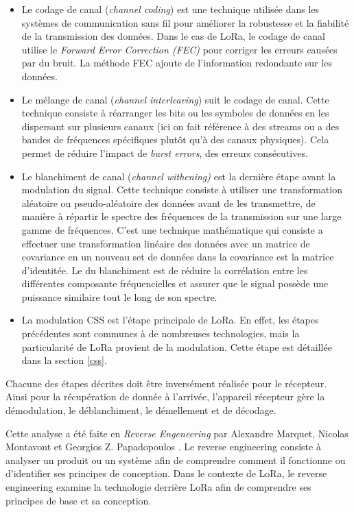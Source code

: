 \begin{itemize}
\item Le codage de canal (\textit{channel coding}) est une technique utilisée dans les systèmes de communication sans fil pour améliorer la robustesse et la fiabilité de la transmission des données. Dans le cas de LoRa, le codage de canal utilise le \textit{Forward Error Correction (FEC)} pour corriger les erreurs causées par du bruit. La méthode FEC ajoute de l'information redondante sur les données.
\item Le mélange de canal (\textit{channel interleaving}) suit le codage de canal.  
Cette technique consiste à réarranger les bits ou les symboles de données en les dispersant sur plusieurs canaux (ici on fait référence à des streams ou a des bandes de fréquences spécifiques plutôt qu'à des canaux physiques). Cela permet de réduire l'impact de \textit{burst errors}, des erreurs consécutives.
\item Le blanchiment de canal (\textit{channel withening)} est la dernière étape avant la modulation du signal.
Cette technique consiste à utiliser une transformation aléatoire ou pseudo-aléatoire des données avant de les transmettre, de manière à répartir le spectre des fréquences de la transmission sur une large gamme de fréquences. C'est une technique mathématique qui consiste a effectuer une transformation linéaire des données avec un matrice de covariance en un nouveau set de données dans la covariance est la matrice d'identitée. Le du blanchiment est de réduire la corrélation entre les différentes composante fréquencielles et assurer que le signal possède une puissance similaire tout le long de son spectre.
\item La modulation CSS est l'étape principale de LoRa. En effet, les étapes précédentes sont communes à de nombreuses technologies, mais la particularité de LoRa provient de la modulation. Cette étape est détaillée dans la section \ref{css}.
\end{itemize}

\vspace{0.1cm}

Chacune des étapes décrites doit être inversément réalisée pour le récepteur. Ainsi pour la récupération de donnée à l'arrivée, l'appareil récepteur gère la démodulation, le déblanchiment, le démellement et de décodage.

\vspace{0.1cm}

Cette analyse a été faite en \textit{Reverse Engeneering} par Alexandre Marquet, Nicolas Montavont et Georgios Z. Papadopoulos \cite{lorareverse}. Le reverse engineering consiste à analyser un produit ou un système afin de comprendre comment il fonctionne ou d'identifier ses principes de conception. Dans le contexte de LoRa, le reverse engineering examine la technologie derrière LoRa afin de comprendre ses principes de base et sa conception.


